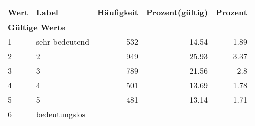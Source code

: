      \begin{longtable}{lXrrr}
     \toprule
     \textbf{Wert} & \textbf{Label} & \textbf{Häufigkeit} & \textbf{Prozent(gültig)} & \textbf{Prozent} \\
     \endhead
     \midrule
     \multicolumn{5}{l}{\textbf{Gültige Werte}}\\

     1 &
     \multicolumn{1}{X}{ sehr bedeutend   } &


       \num{532} &
       \num[round-mode=places,round-precision=2]{14.54} &
         \num[round-mode=places,round-precision=2]{1.89} \\

     2 &
     \multicolumn{1}{X}{ 2   } &


       \num{949} &
       \num[round-mode=places,round-precision=2]{25.93} &
         \num[round-mode=places,round-precision=2]{3.37} \\

     3 &
     \multicolumn{1}{X}{ 3   } &


       \num{789} &
       \num[round-mode=places,round-precision=2]{21.56} &
         \num[round-mode=places,round-precision=2]{2.8} \\

     4 &
     \multicolumn{1}{X}{ 4   } &


       \num{501} &
       \num[round-mode=places,round-precision=2]{13.69} &
         \num[round-mode=places,round-precision=2]{1.78} \\

     5 &
     \multicolumn{1}{X}{ 5   } &


       \num{481} &
       \num[round-mode=places,round-precision=2]{13.14} &
         \num[round-mode=places,round-precision=2]{1.71} \\

     6 &
     \multicolumn{1}{X}{ bedeutungslos   } &



\end{longtable}
